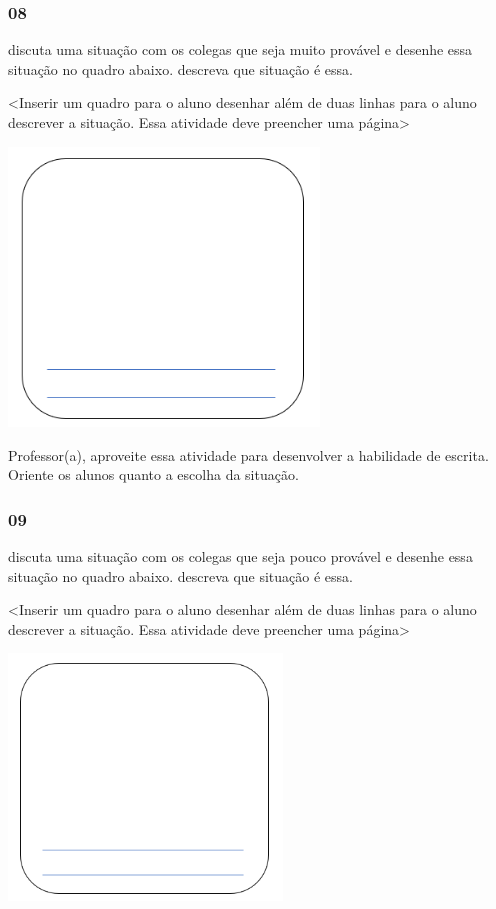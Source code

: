 \subsubsection{08}\label{section-70}

discuta uma situação com os colegas que seja muito provável e desenhe
essa situação no quadro abaixo. descreva que situação é essa.

\textless{}Inserir um quadro para o aluno desenhar além de duas linhas
para o aluno descrever a situação. Essa atividade deve preencher uma
página\textgreater{}

\includegraphics[width=3.24914in,height=2.92171in]{media/image92.png}

Professor(a), aproveite essa atividade para desenvolver a habilidade de
escrita. Oriente os alunos quanto a escolha da situação.

\subsubsection{09}\label{section-71}

discuta uma situação com os colegas que seja pouco provável e desenhe
essa situação no quadro abaixo. descreva que situação é essa.

\textless{}Inserir um quadro para o aluno desenhar além de duas linhas
para o aluno descrever a situação. Essa atividade deve preencher uma
página\textgreater{}

\includegraphics[width=2.86272in,height=2.57423in]{media/image92.png}

